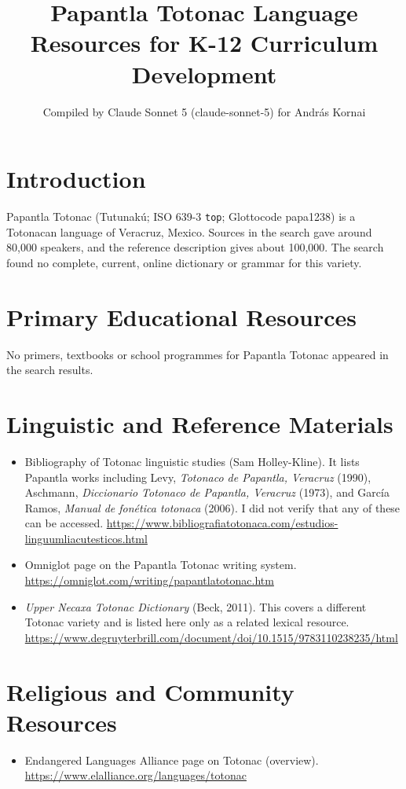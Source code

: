 \documentclass[12pt]{article}
\title{Papantla Totonac Language Resources for K-12 Curriculum Development}
\author{Compiled by Claude Sonnet 5 (claude-sonnet-5) for Andr\'as Kornai}
\date{}
\begin{document}
\maketitle

\section{Introduction}
Papantla Totonac (Tutunak\'u; ISO 639-3 \texttt{top}; Glottocode papa1238) is a Totonacan language of Veracruz, Mexico. Sources in the search gave around 80,000 speakers, and the reference description gives about 100,000. The search found no complete, current, online dictionary or grammar for this variety.

\section{Primary Educational Resources}
No primers, textbooks or school programmes for Papantla Totonac appeared in the search results.

\section{Linguistic and Reference Materials}
\begin{itemize}
\item Bibliography of Totonac linguistic studies (Sam Holley-Kline). It lists Papantla works including Levy, \emph{Totonaco de Papantla, Veracruz} (1990), Aschmann, \emph{Diccionario Totonaco de Papantla, Veracruz} (1973), and Garc\'ia Ramos, \emph{Manual de fon\'etica totonaca} (2006). I did not verify that any of these can be accessed. \url{https://www.bibliografiatotonaca.com/estudios-linguumliacutesticos.html}
\item Omniglot page on the Papantla Totonac writing system. \url{https://omniglot.com/writing/papantlatotonac.htm}
\item \emph{Upper Necaxa Totonac Dictionary} (Beck, 2011). This covers a different Totonac variety and is listed here only as a related lexical resource. \url{https://www.degruyterbrill.com/document/doi/10.1515/9783110238235/html}
\end{itemize}

\section{Religious and Community Resources}
\begin{itemize}
\item Endangered Languages Alliance page on Totonac (overview). \url{https://www.elalliance.org/languages/totonac}
\end{itemize}
\end{document}
